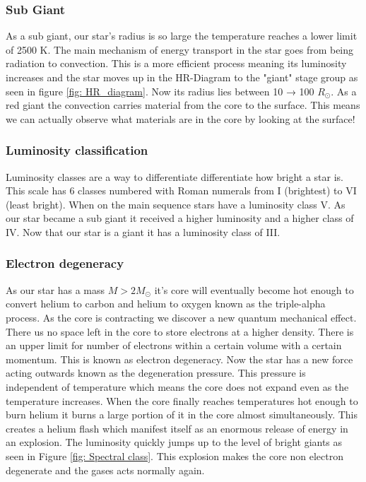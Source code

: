\documentclass[reprint,english,notitlepage]{revtex4-2}
\begin{document}
\subsubsection*{Sub Giant}
As a sub giant, our star's radius is so large the temperature reaches a lower limit of 2500 K. The main mechanism of energy transport in the star goes from being radiation to convection. This is a more efficient process meaning its luminosity increases and the star moves up in the HR-Diagram to the "giant" stage group as seen in figure \ref{fig: HR_diagram}. Now its radius lies between 10 → 100 $ R_{⊙} $. As a red giant the convection carries material from the core to the surface. This means we can actually observe what materials are in the core by looking at the surface!

\subsubsection*{Luminosity classification}
Luminosity classes are a way to differentiate differentiate how bright a star is. This scale has 6 classes numbered with Roman numerals from I (brightest) to VI (least bright). When on the main sequence stars have a luminosity class V. As our star became a sub giant it received a higher luminosity and a higher class of IV. Now that our star is a giant it has a luminosity class of III.   


\subsubsection*{Electron degeneracy}
As our star has a mass $ M > 2M_{⊙} $ it's core will eventually become hot enough to convert helium to carbon and helium to oxygen known as the triple-alpha process. As the core is contracting we discover a new quantum mechanical effect. There us no space left in the core to store electrons at a higher density. There is an upper limit for number of electrons within a certain volume with a certain momentum. This is known as electron degeneracy. Now the star has a new force acting outwards known as the degeneration pressure. This pressure is independent of temperature  which means the core does not expand even as the temperature increases. When the core finally reaches temperatures hot enough to burn helium it burns a large portion of it in the core almost simultaneously. This creates a helium flash which manifest itself as an enormous release of energy in an explosion. The luminosity quickly jumps up to the level of bright giants as seen in Figure \ref{fig: Spectral class}. This explosion makes the core non electron degenerate and the gases acts normally again. 
\end{document}
